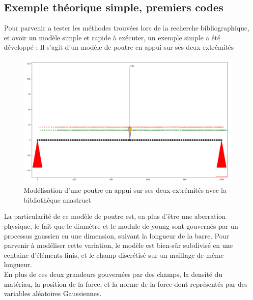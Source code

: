 \documentclass[a4paper,10pt]{article}
\begin{document}
\subsection{Exemple théorique simple, premiers codes}
Pour parvenir a tester les méthodes trouvées lors de la recherche bibliographique, et avoir un modèle simple et rapide à exécuter, un exemple simple a été développé : 
Il s'agit d'un modèle de poutre en appui sur ses deux extrémités
\begin{figure}[H]
   \centering   
   \includegraphics[scale=0.20]{beam_structure.png}
      \caption{Modélisation d'une poutre en appui sur ses deux extrémités avec la bibliothèque anastruct}
         \label{fig:nonfloat}
\end{figure}

La particularité de ce modèle de poutre est, en plus d'être une aberration physique, le fait que le diamètre et le module de young sont gouvernés par un processus gaussien en une dimension, suivant la longueur de la barre. Pour parvenir à modéliser cette variation, le modèle est bien-sûr subdivisé en une centaine d'éléments finis, et le champ discrétisé sur un maillage de même longueur.\\
En plus de ces deux grandeurs gouvernées par des champs, la densité du matériau, la position de la force, et la norme de la force dont représentés par des variables aléatoires Gaussiennes. 
\end{document}
